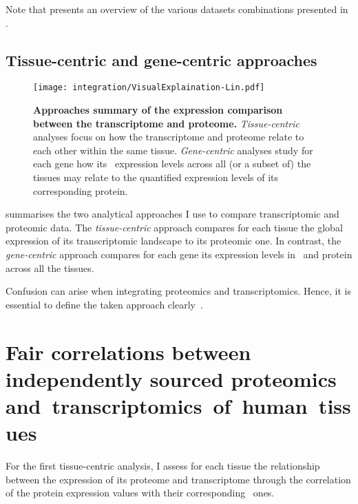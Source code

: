 Note that  presents
an overview of the various datasets combinations presented
in .\mybr\

\subsection{Tissue-centric and gene-centric approaches}

\begin{figure}[!htpb]
    \texttt{[image: integration/VisualExplaination-Lin.pdf]}\centering
    \caption[Summary of the expression comparison approaches between
    the transcriptome and proteome]{\label{fig:visualexp}\textbf{Approaches
    summary of the expression comparison between the transcriptome and proteome.}
    \emph{Tissue-centric} analyses focus on
    how the transcriptome and proteome relate to each other within the same tissue.
    \emph{Gene-centric} analyses study for each gene how its \mRNA\ expression
    levels across all (or a subset of) the tissues may relate to
    the quantified expression levels of its corresponding protein.
    }
\end{figure}

 summarises the two analytical approaches I use
to compare transcriptomic and proteomic data.
The \emph{tissue-centric} approach compares for each tissue
the global expression of its transcriptomic landscape to its proteomic one.
In contrast,
the \emph{gene-centric} approach compares for each gene
its expression levels in \mRNA\ and protein across all the tissues.

Confusion can arise
when integrating proteomics and transcriptomics.
Hence, it is essential
to define the taken approach clearly~.\mybr\

\section{Fair correlations between independently sourced proteomics~%
and~transcriptomics~of~human~tissues~}\label{subsec:IntegrationGoodCorrProtTrans}
\vspace{-2mm}

For the first tissue-centric analysis,
I assess for each tissue the relationship between
the expression of its proteome and transcriptome
through the correlation of the protein expression values
with their corresponding \mRNA\ ones.\mybr\

